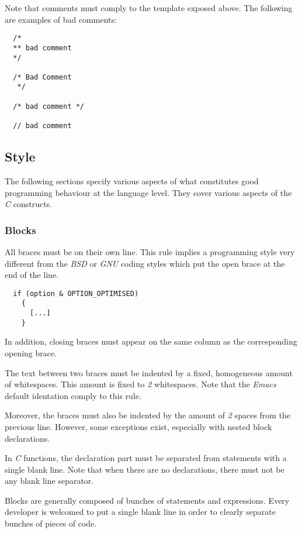 Note that comments must comply to the template exposed above. The following
are examples of bad comments:

\begin{verbatim}
  /*
  ** bad comment
  */

  /* Bad Comment
   */

  /* bad comment */

  // bad comment
\end{verbatim}

%
%

\subsection{Style}

The following sections specify various aspects of what constitutes good
programming behaviour at the language level. They cover various aspects
of the \textit{C} constructs.


\subsubsection{Blocks}

All braces must be on their own line. This rule implies a programming style
very different from the \textit{BSD} or \textit{GNU} coding styles which
put the open brace at the end of the line.

\begin{verbatim}
  if (option & OPTION_OPTIMISED)
    {
      [...]
    }
\end{verbatim}

In addition, closing braces must appear on the same column as the
corresponding opening brace.

The text between two braces must be indented by a fixed, homogeneous amount
of whitespaces. This amount is fixed to \textit{2} whitespaces. Note that
the \textit{Emacs} default identation comply to this rule.

Moreover, the braces must also be indented by the amount of \textit{2}
spaces from the previous line. However, some exceptions exist, especially
with nested block declarations.

In \textit{C} functions, the declaration part must be separated from statements
with a single blank line. Note that when there are no declarations, there
must not be any blank line separator.

Blocks are generally composed of bunches of statements and expressions. Every
developer is welcomed to put a single blank line in order to clearly separate
bunches of pieces of code.

